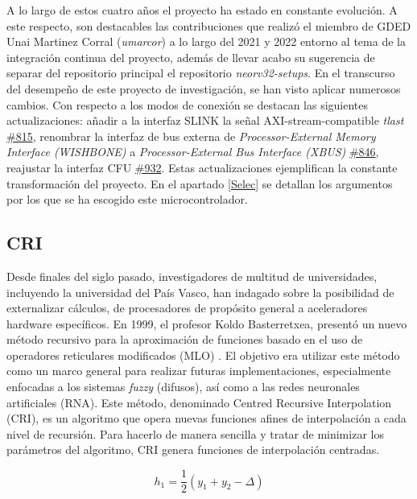 A lo largo de estos cuatro años el proyecto ha estado en constante evolución.
A este respecto, son destacables las contribuciones que realizó el miembro de GDED Unai Martinez Corral (\textit{umarcor}) a lo largo del 2021 y 2022 entorno al tema de la integración continua del proyecto, además de llevar acabo su sugerencia de separar del repositorio principal el repositorio \textit{neorv32-setups}.
En el transcurso del desempeño de este proyecto de investigación, se han visto aplicar numerosos cambios.
Con respecto a los modos de conexión se destacan las siguientes actualizaciones:
añadir a la interfaz SLINK la señal AXI-stream-compatible \textit{tlast} \href{https://github.com/stnolting/neorv32/pull/815}{\#815}, renombrar la interfaz de bus externa de \textit{Processor-External Memory Interface (WISHBONE)} a \textit{Processor-External Bus Interface (XBUS)} \href{https://github.com/stnolting/neorv32/pull/846}{\#846}, reajustar la interfaz CFU \href{https://github.com/stnolting/neorv32/pull/932}{\#932}.
Estas actualizaciones ejemplifican la constante transformación del proyecto. 
En el apartado \ref{Selec} se detallan los argumentos por los que se ha escogido este microcontrolador.

\subsection{CRI}

\label{cri}

Desde finales del siglo pasado, investigadores de multitud de universidades, incluyendo la universidad del País Vasco, han indagado sobre la posibilidad de externalizar cálculos, de procesadores de propósito general a aceleradores hardware específicos.
En 1999, el profesor Koldo Basterretxea, presentó un nuevo método recursivo para la aproximación de funciones basado en el uso de operadores reticulares modificados (MLO) \cite{basterretxea1999pwl} \cite{tarela2002optimised}.
El objetivo era utilizar este método como un marco general para realizar futuras implementaciones, especialmente enfocadas a los sistemas \textit{fuzzy} (difusos), así como a las redes neuronales artificiales (RNA).
Este método, denominado Centred Recursive Interpolation (CRI), es un algoritmo que opera nuevas funciones afines de interpolación a cada nivel de recursión.
Para hacerlo de manera sencilla y tratar de minimizar los parámetros del algoritmo, CRI genera funciones de interpolación centradas.

\begin{equation}\label{ec:1}
h_{1} = \frac{1}{2} (y_{1} + y_{2} - \Delta)\tag{*}
\end{equation}


